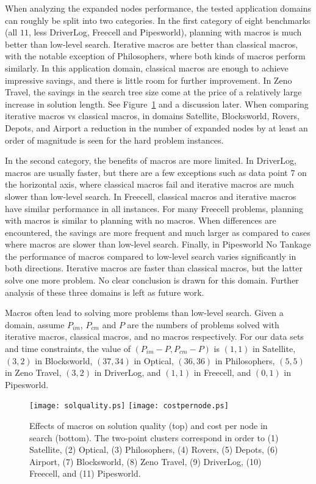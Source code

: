 \documentclass{article}
\begin{document}
When analyzing the expanded nodes performance,
the tested application domains can roughly be split into two categories.
In the first category of eight benchmarks
(all $11$, less DriverLog, Freecell and Pipesworld),
planning with macros is much better than low-level search.
Iterative macros are better than classical macros, with the notable exception
of Philosophers, where both kinds of macros perform similarly.
In this application domain, classical macros are enough to achieve impressive savings,
and there is little room for further improvement.
In Zeno Travel, the savings in the search tree size
come at the price of a relatively large increase in solution length.
See Figure~\ref{fig:sol-and-cpn} and a discussion later.
When comparing iterative macros vs classical macros,
in domains Satellite, Blocksworld, Rovers, Depots, and Airport
a reduction in the number of expanded nodes by at least an order of magnitude
is seen for the hard problem instances.

In the second category, the benefits of macros are more limited.
In DriverLog, macros are usually faster, 
but there are a few exceptions such as data point 7 on the horizontal axis,
where classical macros fail and iterative macros are much slower than low-level search.
In Freecell, classical macros and iterative macros have similar performance in all
instances.
For many Freecell problems, planning with macros is similar to planning with no macros.
When differences are encountered, 
the savings are more frequent and much larger as compared to
cases where macros are slower than low-level search.
Finally, in Pipesworld No Tankage the performance of macros
compared to low-level search varies significantly in both directions.
Iterative macros are faster than classical macros,
but the latter solve one more problem.
No clear conclusion is drawn for this domain.
Further analysis of these three domains is left as future work.

Macros often lead to solving more problems than low-level search.
Given a domain, assume $P_{\textit{im}}$, $P_{\textit{cm}}$ and $P$
are the numbers of problems solved with iterative macros,
classical macros, and no macros respectively.
For our data sets and time constraints,
the value of $(P_{\textit{im}} - P, P_{\textit{cm}} - P)$ is $(1,1)$ in Satellite, $(3,2)$ in Blocksworld,
$(37,34)$ in Optical, $(36,36)$ in Philosophers, $(5,5)$ in Zeno Travel, 
$(3,2)$ in DriverLog, and $(1,1)$ in Freecell, and $(0,1)$ in Pipesworld.

\begin{figure}
\begin{center}
\texttt{[image: solquality.ps]}
\texttt{[image: costpernode.ps]}
\caption{Effects of macros on solution quality (top) and cost per node in search (bottom).
The two-point clusters correspond in order to (1) Satellite, (2) Optical,
(3) Philosophers, (4) Rovers, (5) Depots, (6) Airport, (7) Blocksworld,
(8) Zeno Travel, (9) DriverLog, (10) Freecell, and (11) Pipesworld.}
\label{fig:sol-and-cpn}
\end{center}
\end{figure}
\end{document}
